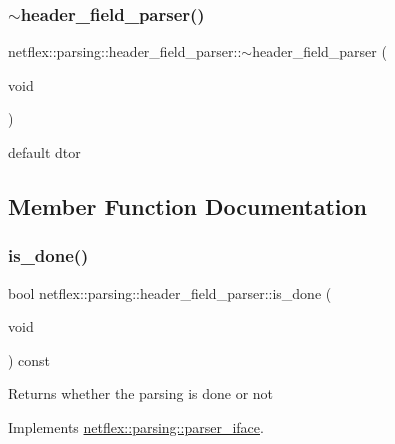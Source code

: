 \subsubsection{\texorpdfstring{$\sim$header\+\_\+field\+\_\+parser()}{~header\_field\_parser()}}
{\footnotesize\ttfamily netflex\+::parsing\+::header\+\_\+field\+\_\+parser\+::$\sim$header\+\_\+field\+\_\+parser (\begin{DoxyParamCaption}\item[{void}]{ }\end{DoxyParamCaption})\hspace{0.3cm}{\ttfamily [default]}}

default dtor 

\subsection{Member Function Documentation}
\mbox{\label{classnetflex_1_1parsing_1_1header__field__parser_a59cc97a4d2104217d23a4d54a31f072f}} 
\subsubsection{\texorpdfstring{is\+\_\+done()}{is\_done()}}
{\footnotesize\ttfamily bool netflex\+::parsing\+::header\+\_\+field\+\_\+parser\+::is\+\_\+done (\begin{DoxyParamCaption}\item[{void}]{ }\end{DoxyParamCaption}) const\hspace{0.3cm}{\ttfamily [virtual]}}

\begin{DoxyReturn}{Returns}
whether the parsing is done or not 
\end{DoxyReturn}


Implements \hyperlink{classnetflex_1_1parsing_1_1parser__iface_afebd1cc50d5958f712dfac0c023fd162}{netflex\+::parsing\+::parser\+\_\+iface}.

\mbox{\label{classnetflex_1_1parsing_1_1header__field__parser_a9b8f37ee50747394ff9740f36b6ac150}} 
